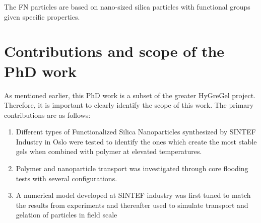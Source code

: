 The FN particles are based on nano-sized silica particles with functional groups given specific properties.


\section{Contributions and scope of the PhD work}

As mentioned earlier, this PhD work is a subset of the greater HyGreGel project. Therefore, it is important to clearly identify the scope of this work. The primary contributions are as follows:

\begin{enumerate}
    \item Different types of Functionalized Silica Nanoparticles synthesized by SINTEF Industry in Oslo were tested to identify the ones which create the most stable gels when combined with polymer at elevated temperatures.
    \item Polymer and nanoparticle transport was investigated through core flooding tests with several configurations.
    \item A numerical model developed at SINTEF industry was first tuned to match the results from experiments and thereafter used to simulate transport and gelation of particles in field scale
\end{enumerate}
